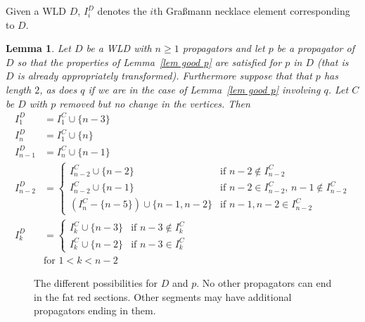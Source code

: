 \documentclass[11pt]{article}
\newtheorem{lem}[thm]{Lemma}
\theoremstyle{remark}
\theoremstyle{definition}
\begin{document}
Given a WLD $D$, $I_i^{D}$ denotes the $i$th Gra\ss mann necklace element corresponding to $D$.

\begin{lem}\label{lem I}
  Let $D$ be a WLD with $n\geq 1$ propagators and let $p$ be a propagator of $D$ so that the properties of Lemma~\ref{lem good p} are satisfied for $p$ in $D$ (that is $D$ is already appropriately transformed).  Furthermore suppose that that $p$ has length $2$, as does $q$ if we are in the case of Lemma~\ref{lem good p} involving $q$.  Let $C$ be $D$ with $p$ removed but no change in the vertices.  Then
  \begin{align*}
    I_1^{D} & = I_1^{C} \cup \{n-3\} \\
    I_n^{D} & = I_1^{C} \cup \{n\} \\
    I_{n-1}^{D} & = I_n^{C} \cup \{n-1\} \\
    I_{n-2}^{D} & =
    \begin{cases}
      I_{n-2}^{C}\cup \{n-2\} & \text{if $n-2\not\in I_{n-2}^{C}$} \\
      I_{n-2}^{C}\cup \{n-1\} & \text{if $n-2\in I_{n-2}^{C}$, $n-1\not\in I_{n-2}^{C}$} \\
      (I_{n}^{C} - \{n-5\})\cup \{n-1,n-2\} & \text{if $n-1, n-2\in I_{n-2}^{C}$}
    \end{cases} \\
    I_{k}^{D} & =
    \begin{cases}
      I_k^{C}\cup \{n-3\} & \text{if $n-3 \not\in I_k^{C}$}\\
      I_k^{C}\cup\{n-2\} & \text{if $n-3\in I_k^{C}$}
    \end{cases} \\
    & \text{for $1<k<n-2$}
  \end{align*}
\end{lem}

\begin{figure}
  \caption{The different possibilities for $D$ and $p$.  No other propagators can end in the fat red sections.  Other segments may have additional propagators ending in them.}\label{fig special p}
\end{figure}
\end{document}
